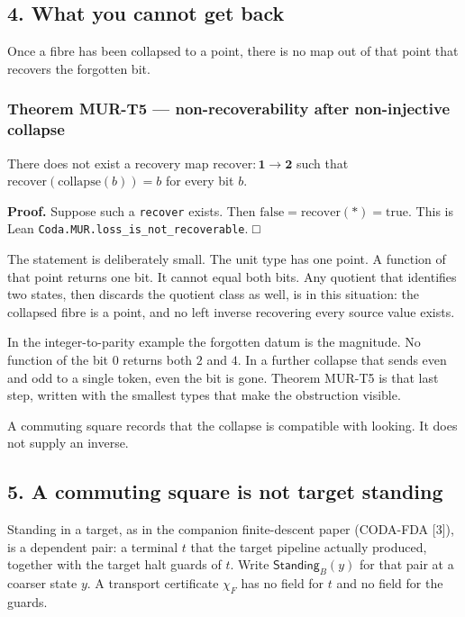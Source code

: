 \documentclass[
  11pt,
]{article}
\begin{document}
\subsection{4. What you cannot get back}\label{what-you-cannot-get-back}

Once a fibre has been collapsed to a point, there is no map out of that point that recovers the forgotten bit.

\subsubsection{Theorem MUR-T5 --- non-recoverability after non-injective collapse}\label{theorem-mur-t5-non-recoverability-after-non-injective-collapse}

There does not exist a recovery map \(\mathrm{recover}:\mathbf{1}\to\mathbf{2}\) such that \(\mathrm{recover}(\mathrm{collapse}(b))=b\) for every bit \(b\).

\textbf{Proof.} Suppose such a \texttt{recover} exists. Then \(\mathrm{false}=\mathrm{recover}(*)=\mathrm{true}\). This is Lean \nolinkurl{Coda.MUR.loss_is_not_recoverable}. □

The statement is deliberately small. The unit type has one point. A function of that point returns one bit. It cannot equal both bits. Any quotient that identifies two states, then discards the quotient class as well, is in this situation: the collapsed fibre is a point, and no left inverse recovering every source value exists.

In the integer-to-parity example the forgotten datum is the magnitude. No function of the bit \(0\) returns both \(2\) and \(4\). In a further collapse that sends even and odd to a single token, even the bit is gone. Theorem MUR-T5 is that last step, written with the smallest types that make the obstruction visible.

A commuting square records that the collapse is compatible with looking. It does not supply an inverse.

\subsection{5. A commuting square is not target standing}\label{a-commuting-square-is-not-target-standing}

Standing in a target, as in the companion finite-descent paper (CODA-FDA {[}3{]}), is a dependent pair: a terminal \(t\) that the target pipeline actually produced, together with the target halt guards of \(t\). Write \(\mathsf{Standing}_B(y)\) for that pair at a coarser state \(y\). A transport certificate \(\chi_F\) has no field for \(t\) and no field for the guards.
\end{document}
